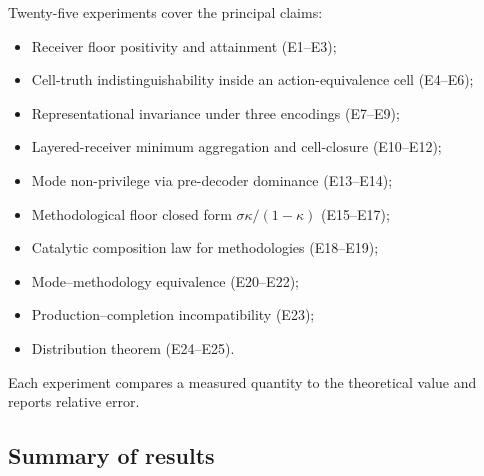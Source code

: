 \documentclass[twocolumn,11pt,a4paper]{article}
\begin{document}
Twenty-five experiments cover the principal claims:
\begin{itemize}[leftmargin=*]
\item Receiver floor positivity and attainment (E1--E3);
\item Cell-truth indistinguishability inside an action-equivalence cell
(E4--E6);
\item Representational invariance under three encodings (E7--E9);
\item Layered-receiver minimum aggregation and cell-closure (E10--E12);
\item Mode non-privilege via pre-decoder dominance (E13--E14);
\item Methodological floor closed form $\sigma\kappa/(1-\kappa)$
(E15--E17);
\item Catalytic composition law for methodologies (E18--E19);
\item Mode--methodology equivalence (E20--E22);
\item Production--completion incompatibility (E23);
\item Distribution theorem (E24--E25).
\end{itemize}
Each experiment compares a measured quantity to the theoretical value and
reports relative error.

\subsection{Summary of results}
\end{document}
